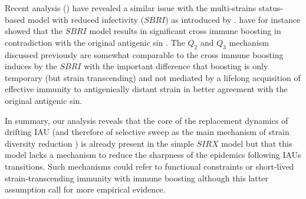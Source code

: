 
Recent analysis (\citet{Kryazhimskiy2007,Ballesteros2009}) have
revealed a similar issue with the multi-strains status-based model
with reduced infectivity ($SBRI$) as introduced by \citet{Gog2002,
  Koelle2006}. \citet{Ballesteros2009} have for instance showed that
the $SBRI$ model results in significant cross immune boosting in
contradiction with the original antigenic sin \citep{Kim2009}. The
$Q_2$ and $Q_3$ mechanism discussed previously are somewhat comparable
to the cross immune boosting induces by the $SBRI$ with the important
difference that boosting is only temporary (but strain transcending)
and not mediated by a lifelong acquisition of effective immunity to
antigenically distant strain in better agreement with the original
antigenic sin.

In summary, our analysis reveals that the core of the replacement
dynamics of drifting IAU (and therefore of selective sweep as the main
mechanism of strain diversity reduction \citep{Koelle2006}) is already
present in the simple $SIRX$ model but that this model lacks a
mechanism to reduce the sharpness of the epidemics following IAUs
transitions. Such mechanisms could refer to functional constraints or
short-lived strain-transcending immunity with immune boosting although
this latter assumption call for more empirical evidence.


